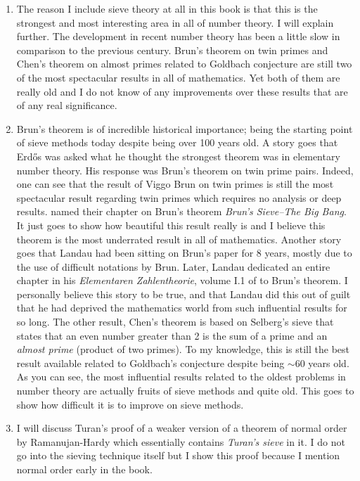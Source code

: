 \documentclass[12pt,leqno]{book}
\theoremstyle{definition}
\theoremstyle{definition}
\begin{document}
\begin{enumerate}[(1)]
			\item The reason I include sieve theory at all in this book is that this is the strongest and most interesting area in all of number theory. I will explain further. The development in recent number theory has been a little slow in comparison to the previous century. Brun's theorem on twin primes and Chen's theorem on almost primes related to Goldbach conjecture are still two of the most spectacular results in all of mathematics. Yet both of them are really old and I do not know of any improvements over these results that are of any real significance. \item Brun's theorem is of incredible historical importance; being the starting point of sieve methods today despite being over 100 years old. A story goes that Erd\H{o}s was asked what he thought the strongest theorem was in elementary number theory. His response was Brun's theorem on twin prime pairs. Indeed, one can see that the result of Viggo Brun on twin primes is still the most spectacular result regarding twin primes which requires no analysis or deep results. \textcite[Chapter VI]{friedlander_iwaniec_2010} named their chapter on Brun's theorem \textit{Brun’s Sieve--The Big Bang}. It just goes to show how beautiful this result really is and I believe this theorem is the most underrated result in all of mathematics. Another story goes that Landau had been sitting on Brun's paper for 8 years, mostly due to the use of difficult notations by Brun. Later, Landau dedicated an entire chapter in his \textit{Elementaren Zahlentheorie}, volume I.1 of \textcite{landau_1927} to Brun's theorem. I personally believe this story to be true, and that Landau did this out of guilt that he had deprived the mathematics world from such influential results for so long. The other result, Chen's theorem is based on Selberg's sieve that states that an even number greater than 2 is the sum of a prime and an \textit{almost prime} (product of two primes). To my knowledge, this is still the best result available related to Goldbach's conjecture despite being $\sim$60 years old. As you can see, the most influential results related to the oldest problems in number theory are actually fruits of sieve methods and quite old. This goes to show how difficult it is to improve on sieve methods.
			\item I will discuss Turan's proof of a weaker version of a theorem of normal order by Ramanujan-Hardy which essentially contains \textit{Turan's sieve} in it. I do not go into the sieving technique itself but I show this proof because I mention normal order early in the book.

\end{enumerate}
\end{document}
